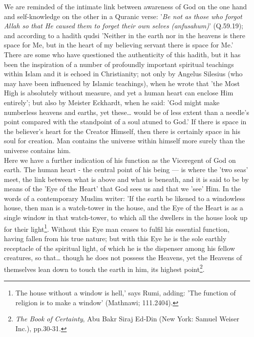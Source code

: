 \documentclass[11pt, b5paper, twoside]{book}
\begin{document}
We are reminded of the intimate link between awareness of God on the one hand and self-knowledge on 
the other in a Quranic verse: '\emph{Be not as those who forgot Allah so that He caused them to forget 
their own selves (anfusahum)}' (Q.59.19); and according to a hadith qudsi 'Neither in the earth nor in 
the heavens is there space for Me, but in the heart of my believing servant there is space for Me.' 
There are some who have questioned the authenticity of this hadith, but it has been the inspiration 
of a number of profoundly important spiritual teachings within Islam and it is echoed in 
Christianity; not only by Angelus Silesius (who may have been influenced by Islamic teachings), when 
he wrote that 'the Most High is absolutely without measure, and yet a human heart can enclose Him 
entirely'; but also by Meister Eckhardt, when he said: 'God might make numberless heavens and earths, 
yet these\ldots{} would be of less extent than a needle's point compared with the standpoint of a soul 
atuned to God.' If there is space in the believer's heart for the Creator Himself, then there is 
certainly space in his soul for creation. Man contains the universe within himself more surely than 
the universe contains him. \\

Here we have a further indication of his function as the Viceregent of God on earth. The human heart 
- the central point of his being --- is where the 'two seas' meet, the link between what is above and 
what is beneath, and it is said to be by means of the 'Eye of the Heart' that God sees us and that we 
'see' Him. In the words of a contemporary Muslim writer: 'If the earth be likened to a windowless 
house, then man is a watch-tower in the house, and the Eye of the Heart is as a single window in that 
watch-tower, to which all the dwellers in the house look up for their light\footnote{The house without a window is hell,' says Rumi, adding: 'The function of religion is to make a 
window' (Mathnawi; 111.2404).}. Without this Eye man 
ceases to fulfil his essential function, having fallen from his true nature; but with this Eye he is 
the sole earthly receptacle of the spiritual light, of which he is the dispenser among his fellow 
creatures, so that\ldots{} though he does not possess the Heavens, yet the Heavens of themselves lean 
down to touch the earth in him, its highest point\footnote{\emph{The Book of Certainty}, Abu Bakr Siraj Ed-Din (New York: Samuel Weiser Inc.), pp.30-31.}. \\
\end{document}
